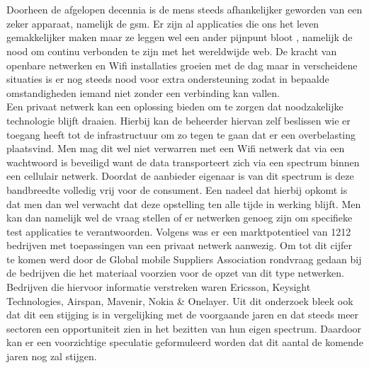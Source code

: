 
\chapter{}%
\label{ch:inleiding}

Doorheen de afgelopen decennia is de mens steeds afhankelijker geworden van een zeker apparaat, namelijk de gsm. Er zijn al applicaties die ons het leven gemakkelijker maken maar ze leggen wel een ander pijnpunt bloot , namelijk de nood om continu verbonden te zijn met het wereldwijde web. De kracht van openbare netwerken en Wifi installaties groeien met de dag maar in verscheidene situaties is er nog steeds nood voor extra ondersteuning zodat in bepaalde omstandigheden iemand niet zonder een verbinding kan vallen. \\
Een privaat netwerk kan een oplossing bieden om te zorgen dat noodzakelijke technologie blijft draaien. Hierbij kan de beheerder hiervan zelf beslissen wie er toegang heeft tot de infrastructuur om zo tegen te gaan dat er een overbelasting plaatsvind. Men mag dit wel niet verwarren met een Wifi netwerk dat via een wachtwoord is beveiligd want de data transporteert zich via een spectrum binnen een cellulair netwerk. Doordat de aanbieder eigenaar is van dit spectrum is deze bandbreedte volledig vrij voor de consument. Een nadeel dat hierbij opkomt is dat men dan wel verwacht dat deze opstelling ten alle tijde in werking blijft. Men kan dan namelijk wel de vraag stellen of er netwerken genoeg zijn om specifieke test applicaties te verantwoorden. Volgens \textcite{Dux2023}  was er een marktpotentieel van 1212 bedrijven met toepassingen van een privaat netwerk aanwezig. Om tot dit cijfer te komen werd door de Global mobile Suppliers Association rondvraag gedaan bij de bedrijven die het materiaal voorzien voor de opzet van dit type netwerken. Bedrijven die hiervoor informatie verstreken waren Ericsson, Keysight Technologies, Airspan, Mavenir, Nokia \& Onelayer. Uit dit onderzoek bleek ook dat dit een stijging is in vergelijking met de voorgaande jaren en dat steeds meer sectoren een opportuniteit zien in het bezitten van hun eigen spectrum. Daardoor kan er een voorzichtige speculatie geformuleerd worden dat dit aantal de komende jaren nog zal stijgen.
\section{}%
\label{sec:probleemstelling}

